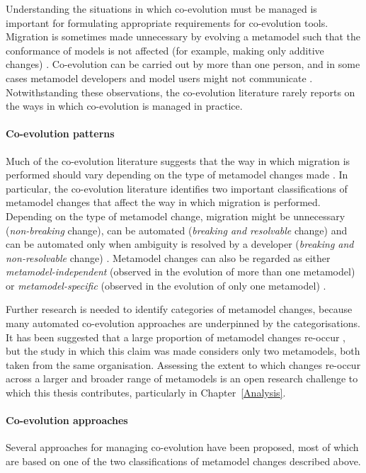 Understanding the situations in which co-evolution must be managed is important for formulating appropriate requirements for co-evolution tools. Migration \cc is sometimes made unnecessary by evolving a metamodel such that the conformance of models is not affected (for example, making only additive changes) \cite{herrmannsdoerfer09cope}. Co-evolution \cc can be carried out by more than one person, and in some cases metamodel developers and model users might not communicate \cite{cicchetti08automating}. Notwithstanding these observations, the co-evolution literature rarely reports on the ways in which co-evolution is managed in practice. 

\paragraph{Co-evolution patterns}
Much of the co-evolution literature suggests that the way in which migration is performed should vary depending on the type of metamodel changes made \cite{gruschko07towards,herrmannsdoerfer09cope,cicchetti08automating,garces09managing}. In particular, the co-evolution literature identifies two important classifications of metamodel changes that affect the way in which migration is performed. Depending \cc on the type of metamodel change, migration might be unnecessary (\emph{non-breaking} change), can be automated (\emph{breaking and resolvable} change) and can be automated only when ambiguity is resolved by a developer (\emph{breaking and non-resolvable} change) \cite{gruschko07towards}. Metamodel \cc changes can also be regarded as either \emph{metamodel-independent} (observed in the evolution of more than one metamodel) or \emph{metamodel-specific} (observed in the evolution of only one metamodel) \cite{herrmannsdoerfer08automatability}.

Further research is needed to identify categories of metamodel changes, because many automated co-evolution approaches are underpinned by the categorisations. It \cc has been suggested that a large proportion of metamodel changes re-occur \cite{herrmannsdoerfer08automatability}, but the study in which this claim was made considers only two metamodels, both taken from the same organisation. Assessing the extent to which changes re-occur across a larger and broader range of metamodels is an open research challenge to which this thesis contributes, particularly in Chapter~\ref{Analysis}.

\paragraph{Co-evolution approaches}
Several approaches for managing co-evolution have been proposed, most of which are based on one of the two classifications of metamodel changes described above.

